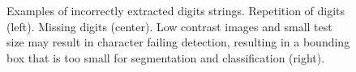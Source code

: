 \documentclass[11pt]{article}
\begin{document}
\begin{figure}[ht]
    \centering
    \caption{
      Examples of incorrectly extracted digits strings. Repetition of digits (left).
      Missing digits (center). Low contrast images and small test size may result in character failing detection,
      resulting in a bounding box that is too small for segmentation and classification (right).
    }
    \label{fig:bad_examples_pipeline}
\end{figure}




\newpage


\end{document}
